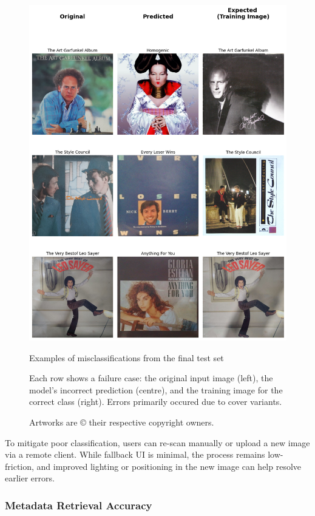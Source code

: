                 \begin{figure}
                    \centering
                    \includegraphics[width=0.5\linewidth]{images/modelEval.png}
                    \caption{Examples of misclassifications from the final test set}
                    \caption*{
                        Each row shows a failure case: the original input image (left), the model's incorrect prediction (centre), and the training image for the correct class (right). Errors primarily occured due to cover variants.
                    }
                    \caption*{
                        Artworks are © their respective copyright owners.
                    }
                    \label{fig:ModelEval}
                \end{figure}
    
                To mitigate poor classification, users can re-scan manually or upload a new image via a remote client. While fallback UI is minimal, the process remains low-friction, and improved lighting or positioning in the new image can help resolve earlier errors.
    
            \subsubsection{Metadata Retrieval Accuracy}
    
